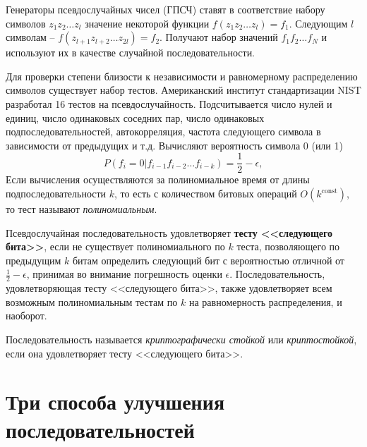 \documentclass[10pt,a4paper]{book}
\begin{document}
Генераторы псевдослучайных чисел (ГПСЧ) ставят в соответствие набору символов $z_{1} z_{2} \dots z_{l}$ значение некоторой функции $f(z_{1} z_{2} \dots z_{l}) = f_{1}$. Следующим $l$ символам -- $f(z_{l+1} z_{l+2} \dots z_{2l}) = f_{2}$. Получают набор значений $f_{1} f_{2} \dots f_{N}$ и используют их в качестве случайной последовательности.

Для проверки степени близости к независимости и равномерному распределению символов существует набор тестов. Американский институт стандартизации NIST разработал 16 тестов на псевдослучайность. Подсчитывается число нулей и единиц, число одинаковых соседних пар, число одинаковых подпоследовательностей, автокорреляция, частота следующего символа в зависимости от предыдущих и т.д. Вычисляют вероятность символа 0 (или 1)
\[
    P(f_i = 0 | f_{i-1} f_{i-2} \dots f_{i-k}) = \frac{1}{2} - \epsilon,
\]
Если вычисления осуществляются за полиномиальное время от длины подпоследовательности $k$, то есть с количеством битовых операций $O(k^{\textrm{const}})$, то тест называют \emph{полиномиальным}.

Псевдослучайная последовательность удовлетворяет \textbf{тесту <<следующего бита>>}, если не существует полиномиального по $k$ теста, позволяющего по предыдущим $k$ битам определить следующий бит с вероятностью отличной от $\frac{1}{2} - \epsilon$, принимая во внимание погрешность оценки $\epsilon$. Последовательность, удовлетворяющая тесту <<следующего бита>>, также удовлетворяет всем возможным полиномиальным тестам по $k$ на равномерность распределения, и наоборот.

Последовательность называется \emph{криптографически стойкой} или \emph{криптостойкой}, если она удовлетворяет тесту <<следующего бита>>.



%



\section[Три способа улучшения последовательностей]{Три способа улучшения \protect\\ последовательностей}






\end{document}
